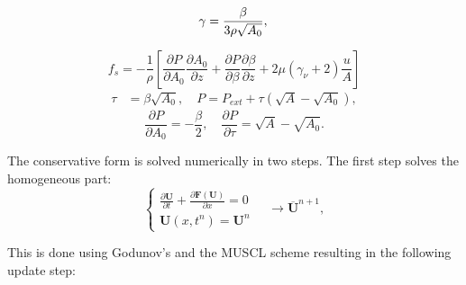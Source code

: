 \documentclass[a4paper, oneside]{discothesis}
\begin{document}
\begin{equation}
	\gamma=\frac{\beta}{3 \rho \sqrt{A_0}}, \\
\end{equation}

\begin{equation}
	f_s=-\frac{1}{\rho}\left[\frac{\partial P}{\partial A_0} \frac{\partial A_0}{\partial z}+\frac{\partial P}{\partial \beta} \frac{\partial \beta}{\partial z}+2 \mu\left(\gamma_\nu+2\right) \frac{u}{A}\right]
\end{equation}
\begin{equation}
	\begin{aligned}
		\tau & =\beta \sqrt{A_0}, \quad P=P_{e x t}+\tau\left(\sqrt{A}-\sqrt{A_0}\right),
	\end{aligned}
\end{equation}
\begin{equation}
	\frac{\partial P}{\partial A_0}=-\frac{\beta}{2}, \quad \frac{\partial P}{\partial \tau}=\sqrt{A}-\sqrt{A_0}.
\end{equation}
\begin{comment}
	The flux Jacobian reads
	\begin{equation}
		\frac{\partial \mathbf{F}}{\partial \mathbf{U}}=\mathbf{H}=\left[\begin{array}{cc}
				0 & 1 \\
				\frac{3}{2} \chi \sqrt{A}-u^2 & 2 u
		\end{array}\right],
	\end{equation}
	which, under the assumption $A>0$, has two eigenvalues
	\begin{equation}
		\lambda_{1,2}=u \mp c, \quad c=\sqrt{\frac{3}{2} \gamma \sqrt{A}}=\sqrt{\frac{\beta}{2 \rho}} A^{1 / 4}
	\end{equation}
\end{comment}

The conservative form is solved numerically in two steps. 
The first step solves the homogeneous part:
\begin{equation}
	\left\{\begin{array}{l}
			\frac{\partial \mathbf{U}}{\partial t}+\frac{\partial \mathbf{F}(\mathbf{U})}{\partial x}=0 \\
			\mathbf{U}\left(x, t^n\right)=\mathbf{U}^n
	\end{array} \quad \rightarrow \overline{\mathbf{U}}^{n+1},\right.
\end{equation}

This is done using Godunov's and the MUSCL scheme resulting in the following update step:
\end{document}
